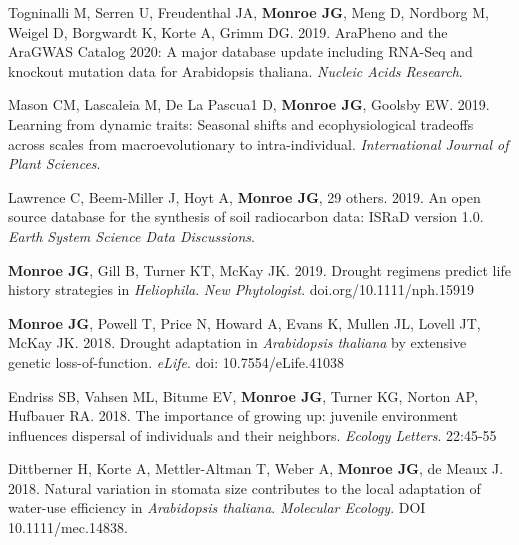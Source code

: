 \documentclass[12pt,english]{article}
\begin{document}
\begin{hangparas}{.5in}{1}
\hspace{1em} Togninalli M, Serren U, Freudenthal JA,  \textbf{Monroe JG}, Meng D, Nordborg M, Weigel D, Borgwardt K, Korte A, Grimm DG. 2019. AraPheno and the AraGWAS Catalog 2020: A major database update including RNA-Seq and knockout mutation data for Arabidopsis thaliana. \textit{Nucleic Acids Research}. 
\vspace{1ex}\par
\hspace{1em} Mason CM, Lascaleia M, De La Pascua1 D, \textbf{Monroe JG},  Goolsby EW. 2019. Learning from dynamic traits: Seasonal shifts and ecophysiological tradeoffs across scales from macroevolutionary to intra-individual. \textit{International Journal of Plant Sciences}. 
\vspace{1ex}\par
\hspace{1em} Lawrence C, Beem-Miller J, Hoyt A, \textbf{Monroe JG},  29 others. 2019. An open source database for the synthesis of soil radiocarbon data: ISRaD version 1.0. \textit{Earth System Science Data Discussions}.
\vspace{1ex}\par
\hspace{1em} \textbf{Monroe JG}, Gill B, Turner KT, McKay JK. 2019. Drought regimens predict life history strategies in \textit{Heliophila}. \textit{New Phytologist}. doi.org/10.1111/nph.15919
\vspace{1ex}\par
\hspace{1em} \textbf{Monroe JG}, Powell T, Price N, Howard A, Evans K, Mullen JL, Lovell JT, McKay JK. 2018. Drought adaptation in \textit{Arabidopsis thaliana} by extensive genetic loss-of-function. \textit{eLife}. doi: 10.7554/eLife.41038
\vspace{1ex}\par
\hspace{1em} Endriss SB, Vahsen ML, Bitume EV, \textbf{Monroe JG}, Turner KG, Norton AP, Hufbauer RA. 2018. The importance of growing up: juvenile environment influences dispersal of individuals and their neighbors. \textit{Ecology Letters}. 22:45-55
\vspace{1ex}\par
\hspace{1em} Dittberner H, Korte A, Mettler-Altman T, Weber A, \textbf{Monroe JG}, de Meaux J. 2018. Natural variation in stomata size contributes to the local adaptation of water-use efficiency in \textit{Arabidopsis thaliana}. \textit{Molecular Ecology}. DOI 10.1111/mec.14838.

\end{hangparas}
\end{document}

